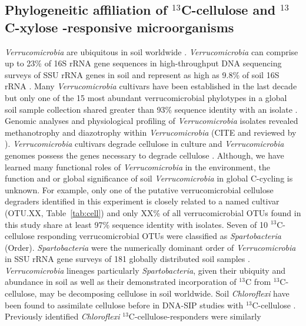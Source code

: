 \subsection{Phylogeneitic affiliation of $^{13}$C-cellulose and $^{13}$C-xylose -responsive microorganisms}
\textit{Verrucomicrobia} are ubiquitous in soil worldwide
\citep{Bergmann_2011}.  \textit{Verrucomicrobia} can comprise up to 23\%
of 16S rRNA gene sequences in high-throughput DNA sequencing surveys of
SSU rRNA genes in soil \citep{Bergmann_2011} and represent as high as
9.8\% of soil 16S rRNA \citep{Buckley_2001}. Many \textit{Verrucomicrobia}
cultivars have been established in the last decade \cite{Wertz_2011} but
only one of the 15 most abundant verrucomicrobial phylotypes in a global
soil sample collection shared greater than 93\% sequence identity with an
isolate \citep{Bergmann_2011}. Genomic analyses and physiological
profiling of \textit{Verrucomicrobia} isolates revealed methanotrophy and
diazotrophy \citep{Wertz_2011} within \textit{Verrucomicrobia} (CITE and
reviewed by \citet{Wertz_2011}). \textit{Verrucomicrobia} cultivars
degrade cellulose in culture and \textit{Verrucomicrobia} genomes possess
the genes necessary to degrade cellulose \citep{Otsuka_2012, Wertz_2011}.
Although, we have learned many functional roles of
\textit{Verrucomicrobia} in the environment, the function and or global
significance of soil \textit{Verrucomicrobia} in global C-cycling is
unknown. For example, only one of the putative verrucomicrobial cellulose
degraders identified in this experiment is closely related to a named
cultivar (OTU.XX, Table~\ref{tab:cell}) and only XX\% of all
verrucomicrobial OTUs found in this study share at least 97\% sequence
identity with isolates. Seven of 10 $^{13}$C-cellulose responding
verrucomicrobial OTUs were classified as \textit{Spartobacteria} (Order).
\textit{Spartobacteria} were the numerically dominant order
of \textit{Verrucomicrobia} in SSU rRNA gene surveys of 181 globally
distributed soil samples \citep{Bergmann_2011}. \textit{Verrucomicrobia}
lineages particularly \textit{Spartobacteria}, given their ubiquity and
abundance in soil as well as their demonstrated incorporation of $^{13}$C from
$^{13}$C-cellulose, may be decomposing cellulose in soil worldwide. 
Soil \textit{Chloroflexi} have been found to assimilate cellulose before in
DNA-SIP studies with $^{13}$C-cellulose \citep{Schellenberger_2010}. Previously
identified \textit{Chloroflexi} $^{13}$C-cellulose-responders were similarly
